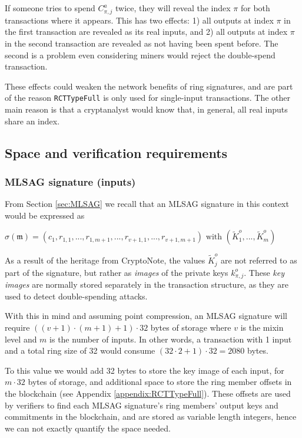 If someone tries to spend $C^a_{\pi,j}$ twice, they will reveal the index $\pi$ for both transactions where it appears. This has two effects: 1) all outputs at index $\pi$ in the first transaction are revealed as its real inputs, and 2) all outputs at index $\pi$ in the second transaction are revealed as not having been spent before. The second is a problem even considering miners would reject the double-spend transaction.

These effects could weaken the network benefits of ring signatures, and are part of the reason {\tt RCTTypeFull} is only used for single-input transactions. The other main reason is that a cryptanalyst would know that, in general, all real inputs share an index.


\subsection{Space and verification requirements}

\subsubsection*{MLSAG signature (inputs)}

From Section \ref{sec:MLSAG} we recall that an MLSAG signature in this context would be expressed as

\hfill \(\sigma(\mathfrak{m}) = (c_1, r_{1, 1}, ..., r_{1, m+1}, ..., r_{v+1, 1}, ..., r_{v+1, m+1}) \textrm{ with } (\tilde{K}^o_1, ..., \tilde{K}^o_m) \) \hfill \phantom{.}

As a result of the heritage from CryptoNote, the values \(\tilde{K}^o_j\) are not referred to as part of the signature, but rather as {\em images} of the private keys $k^o_{\pi,j}$. These {\em key images} are normally stored separately in the transaction structure, as they are used to detect double-spending attacks.

With this in mind and assuming point compression, an MLSAG signature will require $((v + 1) \cdot (m + 1) + 1) \cdot 32$ bytes of storage where $v$ is the mixin level and $m$ is the number of inputs. In other words, a transaction with 1 input and a total ring size of 32 would consume $(32 \cdot 2 + 1) \cdot 32 = 2080$ bytes.

To this value we would add 32 bytes to store the key image of each input, for $m \cdot 32$ bytes of storage, and additional space to store the ring member offsets in the blockchain (see Appendix \ref{appendix:RCTTypeFull}). These offsets are used by verifiers to find each MLSAG signature's ring members' output keys and commitments in the blockchain, and are stored as variable length integers, hence we can not exactly quantify the space needed.

